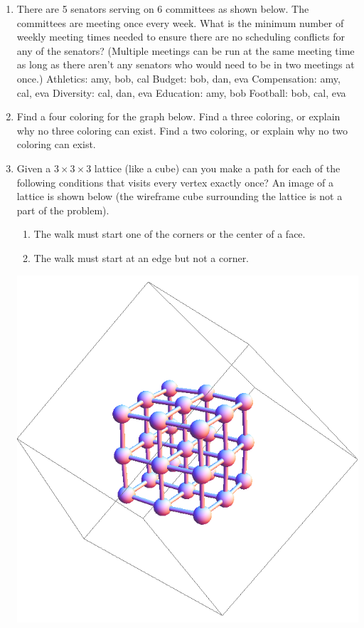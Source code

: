 \documentclass[12pt]{article}
\begin{document}
\begin{enumerate}
\item There are 5 senators serving on 6 committees as shown below. The committees are meeting once every week. What is the minimum number of weekly meeting times needed to ensure there are no scheduling conflicts for any of the senators?  (Multiple meetings can be run at the same
  meeting time as long as there aren't any senators who would need to be in two meetings at once.)
\subitem Athletics: {amy, bob, cal}
\subitem Budget: {bob, dan, eva}
\subitem Compensation: {amy, cal, eva}
\subitem Diversity: {cal, dan, eva}
\subitem Education: {amy, bob}
\subitem Football: {bob, cal, eva}

\pagebreak

\item Find a four coloring for the graph below. Find a three coloring, or explain why no three coloring can exist. Find a two coloring, or explain why no two coloring can exist.

\begin{center}
\end{center}

\item Given a $3\times 3\times 3$ lattice (like a cube) can you make a path for each of the following conditions
  that visits every vertex exactly once?  An image of a lattice is shown below (the wireframe cube surrounding the
  lattice is not a part of the problem).

\begin{enumerate}
	\item The walk must start one of the corners or the center of a face.
	\item The walk must start at an edge but not a corner.
\end{enumerate}

\begin{center}
	\includegraphics[width=.4\textwidth]{c1.png}
\end{center}


\end{enumerate}
\end{document}
